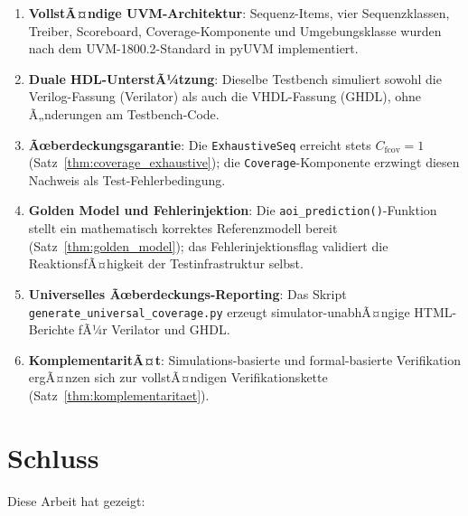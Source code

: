 ﻿\documentclass[12pt,a4paper]{report}
\begin{document}
\begin{enumerate}
    \item \textbf{VollstÃ¤ndige UVM-Architektur}: Sequenz-Items, vier Sequenzklassen,
          Treiber, Scoreboard, Coverage-Komponente und Umgebungsklasse wurden
          nach dem UVM-1800.2-Standard in pyUVM implementiert.
    \item \textbf{Duale HDL-UnterstÃ¼tzung}: Dieselbe Testbench simuliert sowohl
          die Verilog-Fassung (Verilator) als auch die VHDL-Fassung (GHDL),
          ohne Ã„nderungen am Testbench-Code.
    \item \textbf{Ãœberdeckungsgarantie}: Die \texttt{ExhaustiveSeq} erreicht
          stets $C_{\mathrm{fcov}} = 1$ (Satz~\ref{thm:coverage_exhaustive});
          die \texttt{Coverage}-Komponente erzwingt diesen Nachweis als
          Test-Fehlerbedingung.
    \item \textbf{Golden Model und Fehlerinjektion}: Die
          \texttt{aoi\_prediction()}-Funktion stellt ein mathematisch korrektes
          Referenzmodell bereit (Satz~\ref{thm:golden_model}); das
          Fehlerinjektionsflag validiert die ReaktionsfÃ¤higkeit der
          Testinfrastruktur selbst.
    \item \textbf{Universelles Ãœberdeckungs-Reporting}: Das Skript
          \texttt{generate\_universal\_cover\newline age.py} erzeugt simulator-unabhÃ¤ngige
          HTML-Berichte fÃ¼r Verilator und GHDL.
    \item \textbf{KomplementaritÃ¤t}: Simulations-basierte und formal-basierte
          Verifikation ergÃ¤nzen sich zur vollstÃ¤ndigen Verifikationskette
          (Satz~\ref{thm:komplementaritaet}).
\end{enumerate}

\chapter{Schluss}

Diese Arbeit hat gezeigt:
\end{document}
